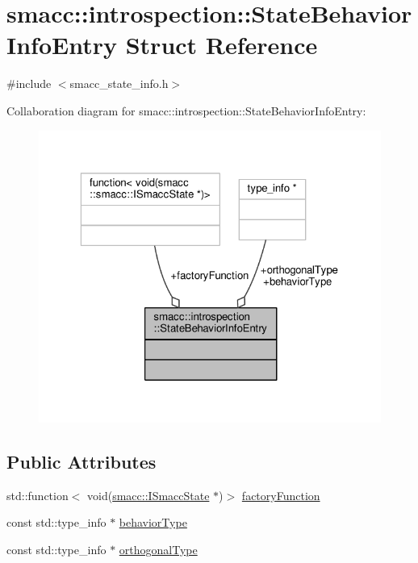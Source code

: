 \hypertarget{structsmacc_1_1introspection_1_1StateBehaviorInfoEntry}{}\section{smacc\+:\+:introspection\+:\+:State\+Behavior\+Info\+Entry Struct Reference}
\label{structsmacc_1_1introspection_1_1StateBehaviorInfoEntry}


{\ttfamily \#include $<$smacc\+\_\+state\+\_\+info.\+h$>$}



Collaboration diagram for smacc\+:\+:introspection\+:\+:State\+Behavior\+Info\+Entry\+:\nopagebreak
\begin{figure}[H]
\begin{center}
\leavevmode
\includegraphics[width=323pt]{structsmacc_1_1introspection_1_1StateBehaviorInfoEntry__coll__graph}
\end{center}
\end{figure}
\subsection*{Public Attributes}
\begin{DoxyCompactItemize}
\item 
std\+::function$<$ void(\hyperlink{classsmacc_1_1ISmaccState}{smacc\+::\+I\+Smacc\+State} $\ast$)$>$ \hyperlink{structsmacc_1_1introspection_1_1StateBehaviorInfoEntry_ac7db4e9a687700edb0207ee100aa3576}{factory\+Function}
\item 
const std\+::type\+\_\+info $\ast$ \hyperlink{structsmacc_1_1introspection_1_1StateBehaviorInfoEntry_a7817d4924f26f4ef16dfdcf40b78b337}{behavior\+Type}
\item 
const std\+::type\+\_\+info $\ast$ \hyperlink{structsmacc_1_1introspection_1_1StateBehaviorInfoEntry_aafb02bbfd8a479d586039b3971dfe7e0}{orthogonal\+Type}
\end{DoxyCompactItemize}



